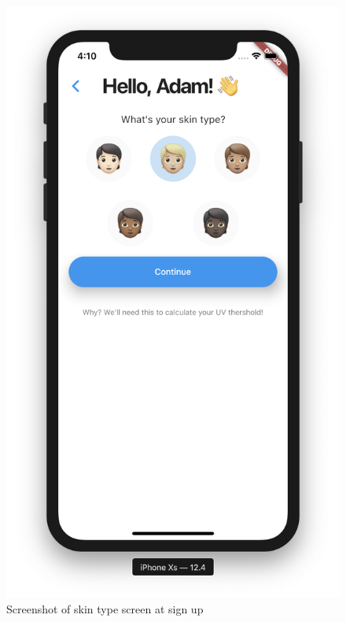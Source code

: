 \documentclass[12pt,openany,a4paper]{book}
\begin{document}
\begin{figure}[h]
\centering\includegraphics[width=\textwidth]{SkinTypeScreen.png}
\caption{Screenshot of skin type screen at sign up}
\label{fig:skin_type_screen}
\end{figure}
\end{document}
